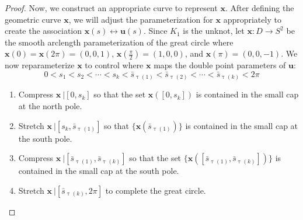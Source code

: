 \documentclass[12pt]{article}
\numberwithin{equation}{subsection}
\theoremstyle{definition}
\numberwithin{lem}{section}
\begin{document}
\begin{proof}
Now, we construct an appropriate curve to represent $\mathbf{x}$.   After defining the geometric curve $\mathbf{x}$, we will adjust the parameterization for $\mathbf{x}$ appropriately to create the association $\mathbf{x}(s) \leftrightarrow \mathbf{u}(s)$.  Since $K_1$ is the unknot, let $\mathbf{x}: D \rightarrow S^2$ be the smooth arclength parameterization of the great circle where $\mathbf{x}(0) = \mathbf{x}(2\pi) = (0,0,1)$, $\mathbf{x}\left(\frac{\pi}{2}\right) = (1,0,0)$, and $\mathbf{x}(\pi) = (0,0,-1)$.  We now reparameterize $\mathbf{x}$ to control where $\mathbf{x}$ maps the double point parameters of $\mathbf{u}$:  
$$0 < s_1 < s_2 < \cdots < s_k < \bar{s}_{\uptau(1)} < \bar{s}_{\uptau(2)} < \cdots < \bar{s}_{\uptau(k)} < 2\pi$$
	\begin{enumerate}
	\item Compress $\mathbf{x}\ | [0,s_k]$ so that the set $\mathbf{x}([0,s_k])$ is contained in the small cap at the north pole.
	\item Stretch $\mathbf{x}\ | [s_k, \bar{s}_{\uptau(1)}]$ so that $\{\mathbf{x}(\bar{s}_{\uptau(1)})\}$ is contained in the small cap at the south pole.
	\item Compress $\mathbf{x}\ | [\bar{s}_{\uptau(1)},\bar{s}_{\uptau(k)}]$ so that the set $\{\mathbf{x}([\bar{s}_{\uptau(1)},\bar{s}_{\uptau(k)}])\}$ is contained in the small cap at the south pole.
	\item Stretch $\mathbf{x}\ | [\bar{s}_{\uptau(k)}, 2\pi]$ to complete the great circle.
	\end{enumerate}


\end{proof}
\end{document}
